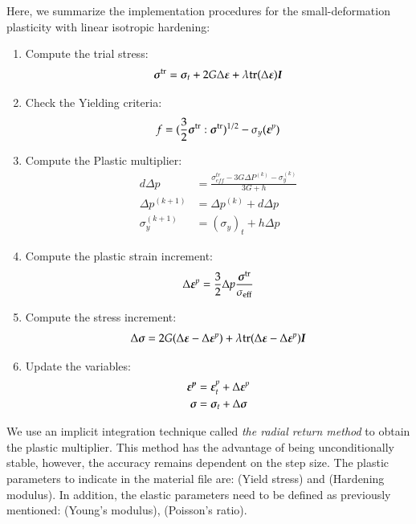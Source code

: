 Here, we summarize the implementation procedures for the
small-deformation plasticity with linear isotropic hardening:
\begin{enumerate}
\item Compute the trial stress:
  \begin{equation}
    {\ensuremath{\boldsymbol{\sigma}}}^{{\mathrm{tr}}} = {\boldsymbol{\sigma}}_t + 2G\Delta \boldsymbol{\varepsilon} + \lambda \mathrm{tr}(\Delta \boldsymbol{\varepsilon})\boldsymbol{I}
  \end{equation}
\item Check the Yielding criteria:
  \begin{equation}
    f = (\frac{3}{2} {\boldsymbol{\sigma}}^{{\mathrm{tr}}} : {\boldsymbol{\sigma}}^{{\mathrm{tr}}})^{1/2}-\sigma_y (\boldsymbol{\varepsilon}^p)
  \end{equation}
\item Compute the Plastic multiplier:
  \begin{align}
    d \Delta p &= \frac{\sigma^{tr}_{eff} - 3G \Delta P^{(k)}- \sigma_y^{(k)}}{3G + h}\\
    \Delta p^{(k+1)} &= \Delta p^{(k)}+ d\Delta p\\
    \sigma_y^{(k+1)} &= (\sigma_y)_t+ h\Delta p
  \end{align}
\item Compute the plastic strain increment:
  \begin{equation}
    \Delta {\ensuremath{\boldsymbol{\varepsilon}}}^p = \frac{3}{2} \Delta p \frac{{\boldsymbol{\sigma}}^{{\mathrm{tr}}}}{\sigma_{{\mathrm{eff}}}}
  \end{equation}
\item Compute the stress increment:
  \begin{equation}
    {\Delta \ensuremath{\boldsymbol{\sigma}}} = 2G(\Delta \boldsymbol{\varepsilon}-\Delta \boldsymbol{\varepsilon}^p) + \lambda  \mathrm{tr}(\Delta \boldsymbol{\varepsilon}-\Delta \boldsymbol{\varepsilon}^p)\boldsymbol{I}
  \end{equation}
\item Update the variables:
  \begin{align}
    {\ensuremath{\boldsymbol{\varepsilon^p}}} &= {\boldsymbol{\varepsilon}}^p_t+{\Delta {\ensuremath{\boldsymbol{\varepsilon}}}^p}\\
    {\boldsymbol{\sigma}} &= {\boldsymbol{\sigma}}_t+{\Delta \boldsymbol{\sigma}}
  \end{align}
\end{enumerate}

We use an implicit integration technique called \emph{the radial
  return method} to obtain the plastic multiplier. This method has the
advantage of being unconditionally stable, however, the accuracy
remains dependent on the step size. The plastic parameters to indicate
in the material file are:  (Yield stress) and
 (Hardening modulus). In addition, the elastic parameters need
to be defined as previously mentioned:  (Young's modulus),
 (Poisson's ratio).

